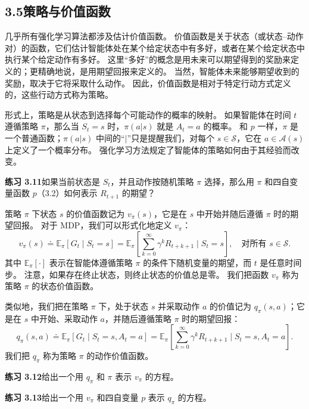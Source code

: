 \documentclass[UTF8,12pt,a4paper,fontset=fandol]{ctexart}
\begin{document}
\subsection*{3.5\quad 策略与价值函数}

几乎所有强化学习算法都涉及估计价值函数。
价值函数是关于状态（或状态--动作对）的函数，它们估计智能体处在某个给定状态中有多好，或者在某个给定状态中执行某个给定动作有多好。
这里“多好”的概念是用未来可以期望得到的奖励来定义的；更精确地说，是用期望回报来定义的。
当然，智能体未来能够期望收到的奖励，取决于它将采取什么动作。
因此，价值函数是相对于特定行动方式定义的，这些行动方式称为策略。

形式上，策略是从状态到选择每个可能动作的概率的映射。
如果智能体在时间 $t$ 遵循策略 $\pi$，那么当 $S_t=s$ 时，$\pi(a|s)$ 就是 $A_t=a$ 的概率。
和 $p$ 一样，$\pi$ 是一个普通函数；$\pi(a|s)$ 中间的“$|$”只是提醒我们，对每个 $s\in\mathcal{S}$，它在 $a\in\mathcal{A}(s)$ 上定义了一个概率分布。
强化学习方法规定了智能体的策略如何由于其经验而改变。

\noindent\textbf{练习 3.11}\quad 如果当前状态是 $S_t$，并且动作按随机策略 $\pi$ 选择，那么用 $\pi$ 和四自变量函数 $p$（3.2）如何表示 $R_{t+1}$ 的期望？

策略 $\pi$ 下状态 $s$ 的价值函数记为 $v_\pi(s)$，它是在 $s$ 中开始并随后遵循 $\pi$ 时的期望回报。
对于 MDP，我们可以形式化地定义 $v_\pi$：
\begin{equation}
v_\pi(s)\doteq \mathbb{E}_\pi[G_t\mid S_t=s]
=\mathbb{E}_\pi\!\left[\sum_{k=0}^{\infty}\gamma^kR_{t+k+1}\mid S_t=s\right],
\quad \text{对所有 }s\in\mathcal{S}.
\tag{3.12}
\end{equation}
其中 $\mathbb{E}_\pi[\cdot]$ 表示在智能体遵循策略 $\pi$ 的条件下随机变量的期望，而 $t$ 是任意时间步。
注意，如果存在终止状态，则终止状态的价值总是零。
我们把函数 $v_\pi$ 称为策略 $\pi$ 的状态价值函数。

类似地，我们把在策略 $\pi$ 下，处于状态 $s$ 并采取动作 $a$ 的价值记为 $q_\pi(s,a)$；它是在 $s$ 中开始、采取动作 $a$，并随后遵循策略 $\pi$ 时的期望回报：
\begin{equation}
q_\pi(s,a)\doteq \mathbb{E}_\pi[G_t\mid S_t=s,A_t=a]
=\mathbb{E}_\pi\!\left[\sum_{k=0}^{\infty}\gamma^kR_{t+k+1}\mid S_t=s,A_t=a\right].
\tag{3.13}
\end{equation}
我们把 $q_\pi$ 称为策略 $\pi$ 的动作价值函数。

\noindent\textbf{练习 3.12}\quad 给出一个用 $q_\pi$ 和 $\pi$ 表示 $v_\pi$ 的方程。

\noindent\textbf{练习 3.13}\quad 给出一个用 $v_\pi$ 和四自变量 $p$ 表示 $q_\pi$ 的方程。
\end{document}
